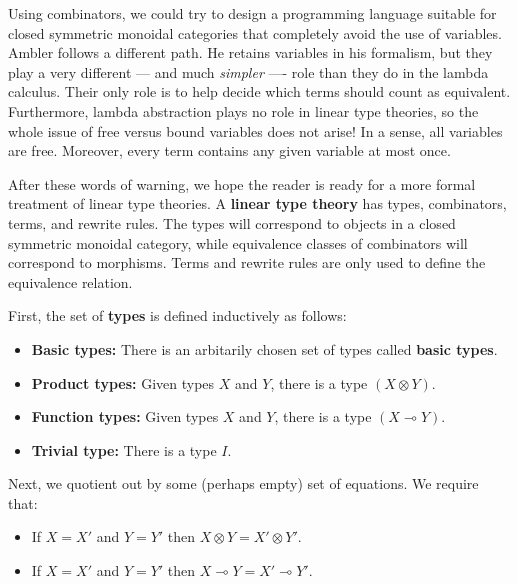\documentclass[12pt,twoside,openright]{report}
\newcommand{\lhom}{\multimap}
\newcommand{\tensor}{\otimes}
\begin{document}
Using combinators, we could try to design a programming language suitable for closed symmetric monoidal categories that completely avoid the use of variables.  Ambler follows a different path.  He retains variables in his formalism, but they play a very different ---
and much {\it simpler} ---- role than they do in the lambda calculus. Their only role is to help decide which terms should count as equivalent.  Furthermore, lambda abstraction plays no role in linear type theories, so the whole issue of free versus bound variables does not arise!  In a sense, all variables are free.  Moreover, every term contains any given variable at most once.

After these words of warning, we hope the reader is ready for a more formal treatment of linear type theories.  A {\bf linear type theory}
has types, combinators, terms, and rewrite rules.  The types will correspond to objects in a closed symmetric monoidal category, while equivalence classes of combinators will correspond to morphisms. Terms and rewrite rules are only used to define the equivalence relation.

First, the set of {\bf types} is defined inductively as follows:
\begin{itemize}
\item {\bf Basic types:}
There is an arbitarily chosen set of types called {\bf basic types}.
\item {\bf Product types:}
Given types $X$ and $Y$, there is a type $(X \tensor Y)$.
\item {\bf Function types:}
Given types $X$ and $Y$, there is a type $(X \lhom Y)$.
\item {\bf Trivial type:} There is a type $I$.
\end{itemize}
Next, we quotient out by some (perhaps empty) set of equations.  We require that:
\begin{itemize}
\item If $X = X'$ and $Y = Y'$ then $X \tensor Y = X' \tensor Y'$.
\item If $X = X'$ and $Y = Y'$ then $X \lhom Y = X' \lhom Y'$.
\end{itemize}
\end{document}
